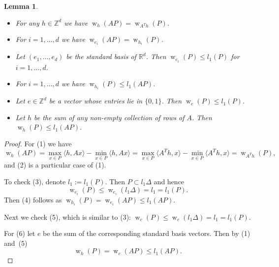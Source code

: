 \documentclass[11pt]{amsart}
\numberwithin{equation}{section}
\theoremstyle{plain}
\newtheorem{Lemma}[Theorem]{Lemma}
\theoremstyle{definition}
\newcommand{\Z}{\mathbb Z}
\newcommand{\R}{\mathbb R}
\newcommand{\w}{\operatorname{w}}
\begin{document}
\begin{Lemma}\label{L:IntroLemma1}
\begin{itemize} 
\item[(1)] For any $h\in \Z^d$ we have $\w_{h}(AP)=\w_{A^{T}h}(P)$.
\item[(2)] For $i=1,\dots, d$ we have $\w_{e_i}(AP)=\w_{h_i}(P)$.
\item[(3)] Let $(e_1,\dots,e_d)$ be the standard basis of $\R^d$. Then $\w_{e_i}(P)\leq l_1(P)$ for $i=1,\dots, d$. 
\item[(4)] For $i=1,\dots, d$ we have $\w_{h_i}(P)\leq l_1(AP)$.
\item[(5)] Let $e\in\Z^d$ be a vector whose entries lie  in $\{0,1\}$. Then $\w_{e}(P)\leq l_1(P)$.
\item[(6)] Let $h$ be the sum of any non-empty collection of rows of $A$. Then $\w_{h}(P)\leq l_1(AP)$.
\end{itemize}
\end{Lemma}

\begin{proof}
For (1) we have
$$\w_h(AP)=\max\limits_{x\in P}\langle h,Ax\rangle- \min\limits_{x\in P}\langle h,Ax\rangle=\max\limits_{x\in P}\langle A^Th,x\rangle- \min\limits_{x\in P}\langle A^Th,x\rangle=\w_{A^Th}(P),
$$
and (2) is a particular case of (1).  

To check (3), denote $l_1:=l_1(P)$. Then $P\subset l_1\Delta$ and hence 
$$\w_{e_i}(P)\leq \w_{e_i}(l_1\Delta)=l_1=l_1(P).$$
Then (4) follows as $\w_{h_i}(P)=\w_{e_i}(AP)\leq l_1(AP).$

Next we check (5), which is similar to (3): $\w_{e}(P)\leq \w_{e}(l_1\Delta)=l_1=l_1(P).$

For (6) let $e$ be the sum of the corresponding standard basis vectors. Then by (1) and~(5)
$$\w_{h}(P)=\w_{e}(AP)\leq l_1(AP).$$
\end{proof}
\end{document}
